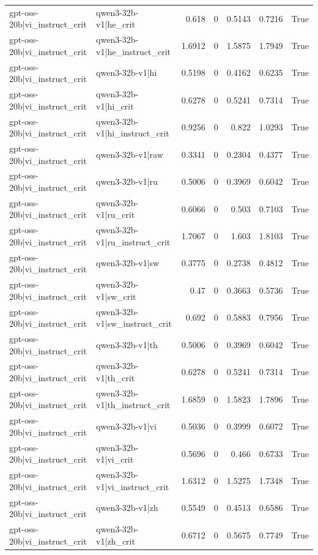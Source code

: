 \begin{table}
\begin{tabular}{l l r r r r l}
gpt-oss-20b|vi_instruct_crit & qwen3-32b-v1|he_crit & 0.618 & 0 & 0.5143 & 0.7216 & True \\
gpt-oss-20b|vi_instruct_crit & qwen3-32b-v1|he_instruct_crit & 1.6912 & 0 & 1.5875 & 1.7949 & True \\
gpt-oss-20b|vi_instruct_crit & qwen3-32b-v1|hi & 0.5198 & 0 & 0.4162 & 0.6235 & True \\
gpt-oss-20b|vi_instruct_crit & qwen3-32b-v1|hi_crit & 0.6278 & 0 & 0.5241 & 0.7314 & True \\
gpt-oss-20b|vi_instruct_crit & qwen3-32b-v1|hi_instruct_crit & 0.9256 & 0 & 0.822 & 1.0293 & True \\
gpt-oss-20b|vi_instruct_crit & qwen3-32b-v1|raw & 0.3341 & 0 & 0.2304 & 0.4377 & True \\
gpt-oss-20b|vi_instruct_crit & qwen3-32b-v1|ru & 0.5006 & 0 & 0.3969 & 0.6042 & True \\
gpt-oss-20b|vi_instruct_crit & qwen3-32b-v1|ru_crit & 0.6066 & 0 & 0.503 & 0.7103 & True \\
gpt-oss-20b|vi_instruct_crit & qwen3-32b-v1|ru_instruct_crit & 1.7067 & 0 & 1.603 & 1.8103 & True \\
gpt-oss-20b|vi_instruct_crit & qwen3-32b-v1|sw & 0.3775 & 0 & 0.2738 & 0.4812 & True \\
gpt-oss-20b|vi_instruct_crit & qwen3-32b-v1|sw_crit & 0.47 & 0 & 0.3663 & 0.5736 & True \\
gpt-oss-20b|vi_instruct_crit & qwen3-32b-v1|sw_instruct_crit & 0.692 & 0 & 0.5883 & 0.7956 & True \\
gpt-oss-20b|vi_instruct_crit & qwen3-32b-v1|th & 0.5006 & 0 & 0.3969 & 0.6042 & True \\
gpt-oss-20b|vi_instruct_crit & qwen3-32b-v1|th_crit & 0.6278 & 0 & 0.5241 & 0.7314 & True \\
gpt-oss-20b|vi_instruct_crit & qwen3-32b-v1|th_instruct_crit & 1.6859 & 0 & 1.5823 & 1.7896 & True \\
gpt-oss-20b|vi_instruct_crit & qwen3-32b-v1|vi & 0.5036 & 0 & 0.3999 & 0.6072 & True \\
gpt-oss-20b|vi_instruct_crit & qwen3-32b-v1|vi_crit & 0.5696 & 0 & 0.466 & 0.6733 & True \\
gpt-oss-20b|vi_instruct_crit & qwen3-32b-v1|vi_instruct_crit & 1.6312 & 0 & 1.5275 & 1.7348 & True \\
gpt-oss-20b|vi_instruct_crit & qwen3-32b-v1|zh & 0.5549 & 0 & 0.4513 & 0.6586 & True \\
gpt-oss-20b|vi_instruct_crit & qwen3-32b-v1|zh_crit & 0.6712 & 0 & 0.5675 & 0.7749 & True \\

\end{tabular}
\end{table}
